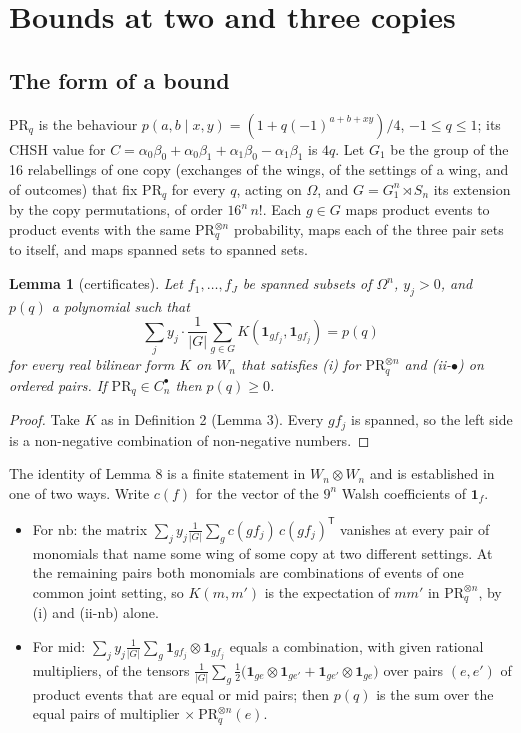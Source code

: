 \documentclass[11pt,a4paper]{article}
\newtheorem{lemma}[theorem]{Lemma}
\theoremstyle{definition}
\theoremstyle{remark}
\newcommand{\PR}{\mathrm{PR}}
\newcommand{\ind}[1]{\mathbf{1}_{#1}}
\newcommand{\nb}{\mathrm{nb}}
\newcommand{\md}{\mathrm{mid}}
\newcommand{\ps}{\bullet}
\begin{document}
\section{Bounds at two and three copies}

\subsection{The form of a bound}

$\PR_q$ is the behaviour $p(a, b \mid x, y) = (1 + q (-1)^{a+b+xy})/4$, $-1 \le q \le 1$; its CHSH value for $C = \alpha_0\beta_0 + \alpha_0\beta_1 + \alpha_1\beta_0 - \alpha_1\beta_1$ is $4q$. Let $G_1$ be the group of the 16 relabellings of one copy (exchanges of the wings, of the settings of a wing, and of outcomes) that fix $\PR_q$ for every $q$, acting on $\Omega$, and $G = G_1^n \rtimes S_n$ its extension by the copy permutations, of order $16^n\, n!$. Each $g \in G$ maps product events to product events with the same $\PR_q^{\otimes n}$ probability, maps each of the three pair sets to itself, and maps spanned sets to spanned sets.

\begin{lemma}[certificates]\label{l:cert}
Let $f_1, \dots, f_J$ be spanned subsets of $\Omega^n$, $y_j > 0$, and $p(q)$ a polynomial such that
\[
  \sum_j y_j \cdot \frac{1}{|G|} \sum_{g \in G} K(\ind{g f_j}, \ind{g f_j}) = p(q)
\]
for every real bilinear form $K$ on $W_n$ that satisfies (i) for $\PR_q^{\otimes n}$ and (ii-$\ps$) on ordered pairs. If $\PR_q \in C_n^{\ps}$ then $p(q) \ge 0$.
\end{lemma}

\begin{proof}
Take $K$ as in Definition 2 (Lemma 3). Every $g f_j$ is spanned, so the left side is a non-negative combination of non-negative numbers.
\end{proof}

The identity of Lemma 8 is a finite statement in $W_n \otimes W_n$ and is established in one of two ways. Write $c(f)$ for the vector of the $9^n$ Walsh coefficients of $\ind{f}$.
\begin{itemize}
  \item For $\nb$: the matrix $\sum_j y_j \frac{1}{|G|} \sum_g c(g f_j)\, c(g f_j)^{\mathsf T}$ vanishes at every pair of monomials that name some wing of some copy at two different settings. At the remaining pairs both monomials are combinations of events of one common joint setting, so $K(m, m')$ is the expectation of $m m'$ in $\PR_q^{\otimes n}$, by (i) and (ii-$\nb$) alone.
  \item For $\md$: $\sum_j y_j \frac{1}{|G|} \sum_g \ind{g f_j} \otimes \ind{g f_j}$ equals a combination, with given rational multipliers, of the tensors $\frac{1}{|G|} \sum_g \frac{1}{2}\bigl(\ind{g e} \otimes \ind{g e'} + \ind{g e'} \otimes \ind{g e}\bigr)$ over pairs $(e, e')$ of product events that are equal or $\md$ pairs; then $p(q)$ is the sum over the equal pairs of multiplier $\times\ \PR_q^{\otimes n}(e)$.
\end{itemize}
\end{document}

